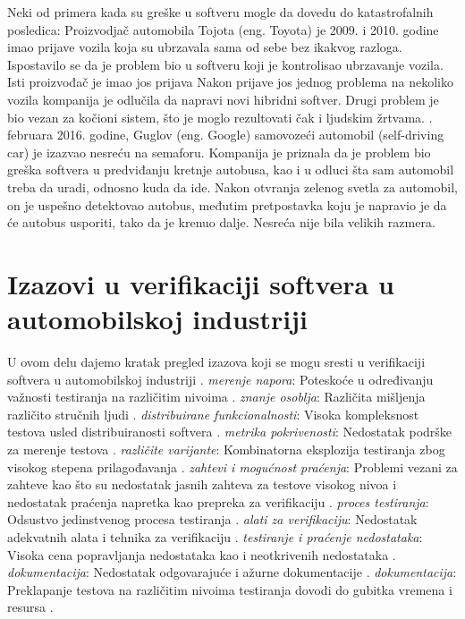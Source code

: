 \documentclass{article}
\begin{document}
\bigbreak
Neki od primera kada su greške u softveru mogle da dovedu do katastrofalnih posledica:
\bigbreak
Proizvodjač automobila Tojota (eng. Toyota) je 2009. i 2010. godine imao prijave vozila koja su ubrzavala sama od sebe bez ikakvog razloga. Ispostavilo se da je problem bio u softveru koji je kontrolisao ubrzavanje vozila. Isti proizvođač je imao jos prijava Nakon prijave jos jednog problema na nekoliko vozila kompanija je odlučila da napravi novi hibridni softver. Drugi problem je bio vezan za kočioni sistem, što je moglo rezultovati čak i ljudskim žrtvama. 
. februara 2016. godine, Guglov (eng. Google) samovozeći automobil (self-driving car) je izazvao nesreću na semaforu. Kompanija je priznala da je problem bio greška softvera u predviđanju kretnje autobusa, kao i u odluci šta sam automobil treba da uradi, odnosno kuda da ide. Nakon otvranja zelenog svetla za automobil, on je uspešno detektovao autobus, međutim pretpostavka koju je napravio je da će autobus usporiti, tako da je krenuo dalje. Nesreća nije bila velikih razmera.

\section{Izazovi u verifikaciji softvera u automobilskoj industriji}

U ovom delu dajemo kratak pregled izazova koji se mogu sresti u verifikaciji softvera u automobilskoj industriji \cite{ref13}\cite{ref14}\cite{ref15}.
\bigbreak
\textit{merenje napora}: Poteskoće u određivanju važnosti testiranja na različitim nivoima \cite{ref14}.
\bigbreak
\textit{znanje osoblja}: Različita mišljenja različito stručnih ljudi \cite{ref14}.
\bigbreak
\textit{distribuirane funkcionalnosti}: Visoka kompleksnost testova usled distribuiranosti softvera \cite{ref14}.
\bigbreak
\textit{metrika pokrivenosti}: Nedostatak podrške za merenje testova \cite{ref14}. 
\bigbreak
\textit{različite varijante}: Kombinatorna eksplozija testiranja zbog visokog stepena prilagođavanja \cite{ref14}.
\bigbreak
\textit{zahtevi i mogućnost praćenja}: Problemi vezani za zahteve kao što su nedostatak jasnih zahteva za testove visokog nivoa i nedostatak praćenja napretka kao prepreka za verifikaciju \cite{ref13}.
\bigbreak
\textit{proces testiranja}: Odsustvo jedinstvenog procesa testiranja \cite{ref13}.
\bigbreak
\textit{alati za verifikaciju}: Nedostatak adekvatnih alata i tehnika za verifikaciju \cite{ref13}.
\bigbreak
\textit{testiranje i praćenje nedostataka}: Visoka cena popravljanja nedostataka kao i neotkrivenih nedostataka \cite{ref13}.
\bigbreak
\textit{dokumentacija}: Nedostatak odgovarajuće i ažurne dokumentacije \cite{ref13}.
\bigbreak
\textit{dokumentacija}: Preklapanje testova na različitim nivoima testiranja dovodi do gubitka vremena i resursa \cite{ref15}.
\end{document}
